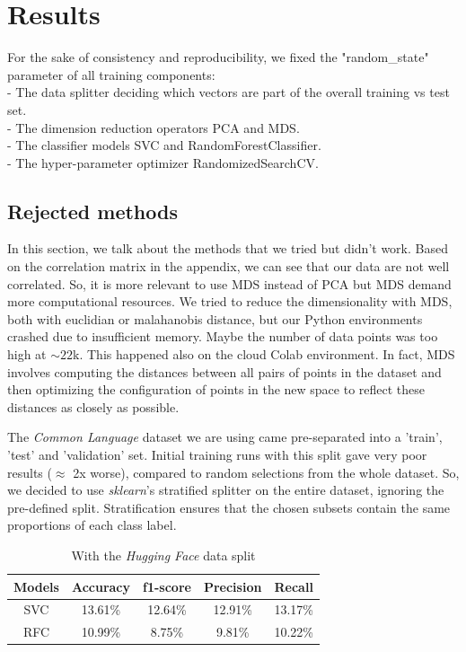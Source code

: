 \documentclass[twocolumn]{article}
\begin{document}
\section{Results}
For the sake of consistency and reproducibility, we fixed the "random\_state" parameter of all training components: \\
- The data splitter deciding which vectors are part of the overall training vs test set. \\
- The dimension reduction operators PCA and MDS. \\
- The classifier models SVC and RandomForestClassifier. \\
- The hyper-parameter optimizer RandomizedSearchCV.

\subsection{Rejected methods}
In this section, we talk about the methods that we tried but didn't work. Based on the correlation matrix in the appendix, we can see that our data are not well correlated. So, it is more relevant to use MDS instead of PCA but MDS demand more computational resources. We tried to reduce the dimensionality with MDS, both with euclidian or malahanobis distance, but our Python environments crashed due to insufficient memory. Maybe the number of data points was too high at $\sim22$k. This happened also on the cloud Colab environment. 
In fact, MDS involves computing the distances between all pairs of points in the dataset and then optimizing the configuration of points in the new space to reflect these distances as closely as possible.

The \textit{Common Language} dataset we are using came pre-separated into a 'train', 'test' and 'validation' set. Initial training runs with this split gave very poor results ($\approx$ 2x worse), compared to random selections from the whole dataset. So, we decided to use \textit{sklearn}'s stratified splitter on the entire dataset, ignoring the pre-defined split. Stratification ensures that the chosen subsets contain the same proportions of each class label.

\begin{table}[h]
    \centering
    \begin{tabular}{|c|c|c|c|c|}
    \hline
      Models & Accuracy & f1-score & Precision & Recall\\  
      \hline
      SVC & 13.61\% & 12.64\% & 12.91\% & 13.17\%\\
        \hline
      RFC & 10.99\% & 8.75\% & 9.81\% & 10.22\% \\
    \hline
    \end{tabular}
    \label{tab:my_label}
    \caption{With the \textit{Hugging Face} data split}
\end{table}
\end{document}
